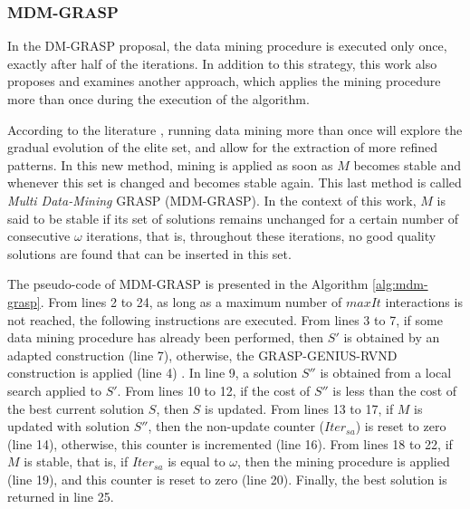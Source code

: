 \documentclass{singlecol-new}
\begin{document}
\subsubsection{MDM-GRASP}
In the DM-GRASP proposal, the data mining procedure is executed only once, exactly after half of the iterations.
In addition to this strategy, this work also proposes and examines another approach, which applies the mining procedure more than once during the execution of the algorithm.


According to the literature \cite{barbalho2013}, running data mining more than once will explore the gradual evolution of the elite set, and allow for the extraction of more refined patterns.
In this new method, mining is applied as soon as $M$ becomes stable and whenever this set is changed and becomes stable again. This last method is called \textit{Multi Data-Mining} GRASP (MDM-GRASP). In the context of this work, $M$ is said to be stable if its set of solutions remains unchanged for a certain number of consecutive $\omega$ iterations, that is, throughout these iterations, no good quality solutions are found that can be inserted in this set.

The pseudo-code of MDM-GRASP is presented in the Algorithm \ref{alg:mdm-grasp}. From lines 2 to 24, as long as a maximum number of $maxIt$ interactions is not reached, the following instructions are executed. From lines 3 to 7, if some data mining procedure has already been performed, then $S'$ is obtained by an adapted construction (line 7), otherwise, the GRASP-GENIUS-RVND construction is applied (line 4) . In line 9, a solution $S''$ is obtained from a local search applied to $S'$. From lines 10 to 12, if the cost of $S''$ is less than the cost of the best current solution $S$, then $S$ is updated. From lines 13 to 17, if $M$ is updated with solution $S''$, then the non-update counter 
($Iter_{sa}$) is reset to zero (line 14), otherwise, this counter is incremented (line 16). From lines 18 to 22, if $M$ is stable, that is, if $Iter_{sa}$ is equal to $\omega$, then the mining procedure is applied (line 19), and this counter is reset to zero (line 20). Finally, the best solution is returned in line 25.
\end{document}
